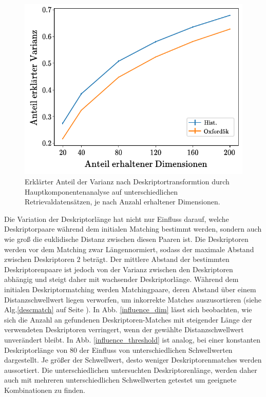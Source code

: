 \begin{figure}[h]
\centering
\includegraphics[scale=1]{explained_variance.pdf}
\caption{Erklärter Anteil der Varianz nach Deskriptortransformtion durch Hauptkomponentenanalyse auf unterschiedlichen Retrievaldatensätzen, je nach Anzahl erhaltener Dimensionen.}
\label{explained_variance_ratio}
\end{figure}
Die Variation der Deskriptorlänge hat nicht nur Einfluss darauf, welche Deskriptorpaare während dem initialen Matching bestimmt werden, sondern auch wie groß die euklidische Distanz zwischen diesen Paaren ist. Die Deskriptoren werden vor dem Matching zwar Längennormiert, sodass der maximale Abstand zwischen Deskriptoren $2$ beträgt. Der mittlere Abstand der bestimmten Deskriptorenpaare ist jedoch von der Varianz zwischen den Deskriptoren abhängig und steigt daher mit wachsender Deskriptorlänge. Während dem initialen Deskriptormatching werden Matchingpaare, deren Abstand über einem Distanzschwellwert liegen verworfen, um inkorrekte Matches auszusortieren (siehe Alg.\ref{descmatch} auf Seite \pageref{descmatch}). In Abb. \ref{influence_dim} lässt sich beobachten, wie sich die Anzahl an gefundenen Deskriptoren-Matches mit steigender Länge der verwendeten Deskriptoren verringert, wenn der gewählte Distanzschwellwert unverändert bleibt. In Abb. \ref{influence_threshold} ist analog, bei einer konstanten Deskriptorlänge von $80$ der Einfluss von unterschiedlichen Schwellwerten dargestellt. Je größer der Schwellwert, desto weniger Deskriptorenmatches werden aussortiert. Die unterschiedlichen untersuchten Deskriptorenlänge, werden daher auch mit mehreren unterschiedlichen Schwellwerten getestet um geeignete Kombinationen zu finden. 

